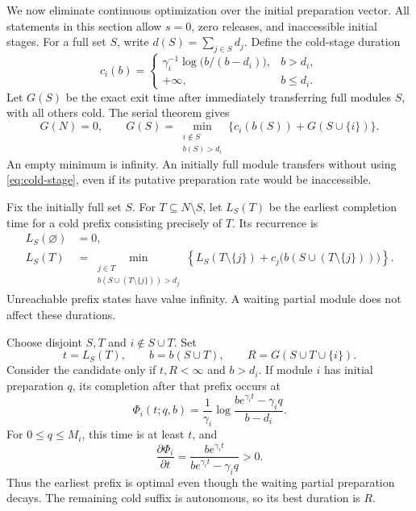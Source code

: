 We now eliminate continuous optimization over the initial preparation vector.
All statements in this section allow \(s=0\), zero releases, and inaccessible
initial stages. For a full set \(S\), write \(d(S)=\sum_{j\in S}d_j\).
Define the cold-stage duration
\begin{equation}
 c_i(b)=
 \begin{cases}
 \gamma_i^{-1}\log\!\bigl(b/(b-d_i)\bigr),&b>d_i,\\
 +\infty,&b\leq d_i.
 \end{cases}
 \label{eq:cold-stage}
\end{equation}
Let \(G(S)\) be the exact exit time after immediately transferring full
modules \(S\), with all others cold. The serial theorem gives
\begin{equation}
 G(N)=0,\qquad
 G(S)=\min_{\substack{i\notin S\\b(S)>d_i}}
 \{c_i(b(S))+G(S\cup\{i\})\}.
 \label{eq:cold-tail-dp}
\end{equation}
An empty minimum is infinity. An initially full module transfers without
using \eqref{eq:cold-stage}, even if its putative preparation rate would be
inaccessible.

Fix the initially full set \(S\). For \(T\subseteq N\setminus S\), let
\(L_S(T)\) be the earliest completion time for a cold prefix consisting
precisely of \(T\). Its recurrence is
\begin{equation}
 \begin{split}
 L_S(\varnothing)&=0,\\
 L_S(T)&=\min_{\substack{j\in T\\b(S\cup(T\setminus\{j\}))>d_j}}
 \left\{L_S(T\setminus\{j\})
       +c_j\bigl(b(S\cup(T\setminus\{j\}))\bigr)\right\}.
 \end{split}
 \label{eq:cold-prefix-dp}
\end{equation}
Unreachable prefix states have value infinity. A waiting partial module does
not affect these durations.

Choose disjoint \(S,T\) and \(i\notin S\cup T\). Set
\[
 t=L_S(T),\qquad b=b(S\cup T),\qquad R=G(S\cup T\cup\{i\}).
\]
Consider the candidate only if \(t,R<\infty\) and \(b>d_i\).
If module \(i\) has initial preparation \(q\), its completion after that
prefix occurs at
\begin{equation}
 \Phi_i(t;q,b)=\frac1{\gamma_i}
 \log\frac{b e^{\gamma_i t}-\gamma_i q}{b-d_i}.
 \label{eq:partial-completion}
\end{equation}
For \(0\leq q\leq M_i\), this time is at least \(t\), and
\begin{equation}
 \frac{\partial\Phi_i}{\partial t}
 =\frac{b e^{\gamma_i t}}{b e^{\gamma_i t}-\gamma_i q}>0.
 \label{eq:prefix-monotonicity}
\end{equation}
Thus the earliest prefix is optimal even though the waiting partial
preparation decays. The remaining cold suffix is autonomous, so its best
duration is \(R\).

